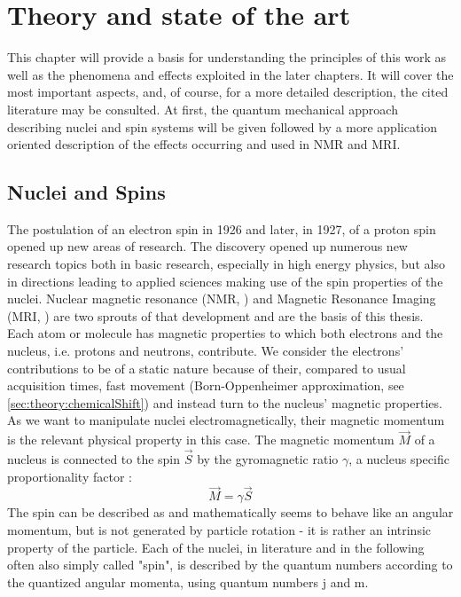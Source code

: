 \chapter{Theory and state of the art}\label{chap:theory}
This chapter will provide a basis for understanding the principles of this work as well as the phenomena and effects exploited in the later chapters. It will cover the most important aspects, and, of course, for a more detailed description, the cited literature may be consulted. At first, the quantum mechanical approach describing nuclei and spin systems will be given followed by a more application oriented description of the effects occurring and used in NMR and MRI.
    \section{Nuclei and Spins}
        \label{sec:theory:nucleiSpins}
        The postulation of an electron spin in 1926 \cite{uhlenbeck_ersetzung_1925, goudsmit_ontdekking_1971} and later, in 1927, of a proton spin \cite{dennison_note_1927} opened up new areas of research. The discovery opened up numerous new research topics both in basic research, especially in high energy physics, but also in directions leading to applied sciences making use of the spin properties of the nuclei. Nuclear magnetic resonance (NMR, \cite{purcell_resonance_1946-1} ) and Magnetic Resonance Imaging (MRI, \cite{mansfield_medical_1977}) are two sprouts of that development and are the basis of this thesis.
        Each atom or molecule has magnetic properties to which both electrons and the nucleus, i.e. protons and neutrons, contribute. We consider the electrons' contributions to be of a static nature because of their, compared to usual acquisition times, fast movement (Born-Oppenheimer approximation, see \ref{sec:theory:chemicalShift}) and instead turn to the nucleus' magnetic properties. As we want to manipulate nuclei electromagnetically, their magnetic momentum is the relevant physical property in this case.
        The magnetic momentum $\vec M$ of a nucleus is connected to the spin $\vec S$ by the gyromagnetic ratio $\gamma$, a nucleus specific proportionality factor \cite{balanis_advanced_nodate}:
        \begin{equation}
            \vec M = \gamma \vec S
            \label{eq:gyromagneticRatio}
        \end{equation}
        The spin can be described as and mathematically seems to behave like an angular momentum, but is not generated by particle rotation - it is rather an intrinsic property of the particle. Each of the nuclei, in literature and in the following often also simply called "spin", is described by the quantum numbers according to the quantized angular momenta, using quantum numbers j and m.
